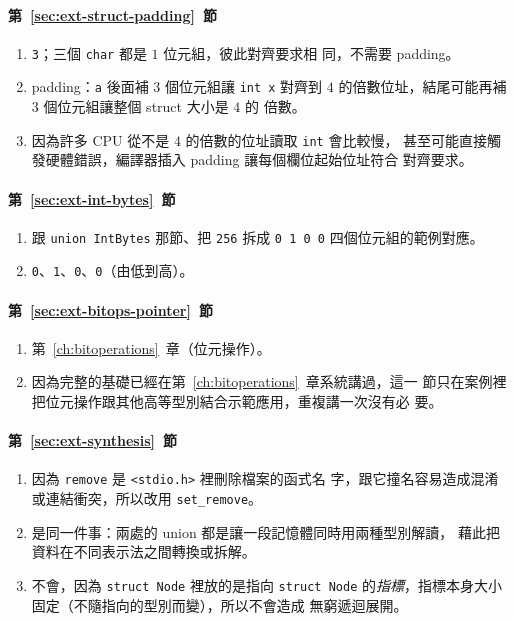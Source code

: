 \paragraph{第~\ref{sec:ext-struct-padding}~節}
\begin{enumerate}
\item \texttt{3}；三個 \texttt{char} 都是 $1$ 位元組，彼此對齊要求相
同，不需要 padding。
\item padding：\texttt{a} 後面補 $3$ 個位元組讓 \texttt{int x} 對齊到
$4$ 的倍數位址，結尾可能再補 $3$ 個位元組讓整個 struct 大小是 $4$ 的
倍數。
\item 因為許多 CPU 從不是 $4$ 的倍數的位址讀取 \texttt{int} 會比較慢，
甚至可能直接觸發硬體錯誤，編譯器插入 padding 讓每個欄位起始位址符合
對齊要求。
\end{enumerate}

\paragraph{第~\ref{sec:ext-int-bytes}~節}
\begin{enumerate}
\item 跟 \texttt{union IntBytes} 那節、把 \texttt{256} 拆成
\texttt{0 1 0 0} 四個位元組的範例對應。
\item \texttt{0}、\texttt{1}、\texttt{0}、\texttt{0}（由低到高）。
\end{enumerate}

\paragraph{第~\ref{sec:ext-bitops-pointer}~節}
\begin{enumerate}
\item 第~\ref{ch:bitoperations}~章（位元操作）。
\item 因為完整的基礎已經在第~\ref{ch:bitoperations}~章系統講過，這一
節只在案例裡把位元操作跟其他高等型別結合示範應用，重複講一次沒有必
要。
\end{enumerate}

\paragraph{第~\ref{sec:ext-synthesis}~節}
\begin{enumerate}
\item 因為 \texttt{remove} 是 \texttt{<stdio.h>} 裡刪除檔案的函式名
字，跟它撞名容易造成混淆或連結衝突，所以改用 \texttt{set\_remove}。
\item 是同一件事：兩處的 union 都是讓一段記憶體同時用兩種型別解讀，
藉此把資料在不同表示法之間轉換或拆解。
\item 不會，因為 \texttt{struct Node} 裡放的是指向 \texttt{struct Node}
的\emph{指標}，指標本身大小固定（不隨指向的型別而變），所以不會造成
無窮遞迴展開。
\end{enumerate}
